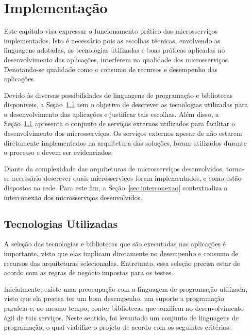 \chapter{Implementação}
\label{cap5}



Este capítulo visa expressar o funcionamento prático dos microsserviços implementados.
%
Isto é necessário pois as escolhas técnicas, envolvendo as linguagens adotadas, as tecnologias utilizadas e boas práticas aplicadas no desenvolvimento das aplicações, interferem na qualidade dos microsserviços.
%
Denotando-se qualidade como o consumo de recursos e desempenho das aplicações.





Devido às diversas possibilidades de linguagens de programação e bibliotecas disponíveis, a Seção~\ref{sec:tecnologias} tem o objetivo de descrever as tecnologias utilizadas para o desenvolvimento das aplicações e justificar tais escolhas.
%
Além disso, a Seção~\ref{sec:tecnologias} apresenta o conjunto de serviços externos utilizados para facilitar o desenvolvimento dos microsserviços.
%
Os serviços externos apesar de não estarem diretamente implementados na arquitetura das soluções, foram utilizados durante o processo e devem ser evidenciados.



Diante da complexidade das arquiteturas de microsserviços desenvolvidos, torna-se necessário descrever quais microsserviços foram implementados, e como estão dispostos na rede.
%
Para este fim, a Seção~\ref{sec:interconexao} contextualiza a interconexão dos microsserviços desenvolvidos.



\section{Tecnologias Utilizadas}
\label{sec:tecnologias}



A seleção das tecnologias e bibliotecas que são executadas nas aplicações é importante, visto que elas implicam diretamente no desempenho e consumo de recursos das arquiteturas selecionadas.
%
Entretanto, essa seleção precisa estar de acordo com as regras de negócio impostas para os testes.



Inicialmente, existe uma preocupação com a linguagem de programação utilizada, visto que ela precisa ter um bom desempenho, um suporte a programação paralela e, ao mesmo tempo, conter bibliotecas que auxiliem no desenvolvimento ágil de tais serviços.
%
Neste sentido, foi levantado um conjunto de linguagens de programação, o qual viabilize o projeto de acordo com os seguintes critérios:



